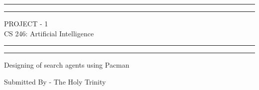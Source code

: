 \documentclass[a4paper, 11pt, oneside]{book} %
\begin{document}
 

\begin{titlepage} %

	\centering %
	
	\scshape %
	
	\vspace*{\baselineskip} %
	
	
	\rule{\textwidth}{1.6pt}\vspace*{-\baselineskip}\vspace*{2pt} %
	\rule{\textwidth}{0.4pt} %
	
	\vspace{0.75\baselineskip} %
	
	{\LARGE PROJECT - 1\\ CS 246: Artificial Intelligence\\} %
	
	\vspace{0.75\baselineskip} %
	
	\rule{\textwidth}{0.4pt}\vspace*{-\baselineskip}\vspace{3.2pt} %
	\rule{\textwidth}{1.6pt} %
	
	\vspace{2\baselineskip} %
	
	
	 Designing of search agents using Pacman\\
	
	\vspace*{3\baselineskip} %
	
	
	Submitted By - The Holy Trinity
	
	\vspace{0.5\baselineskip} %
	

\end{titlepage}
\end{document}
